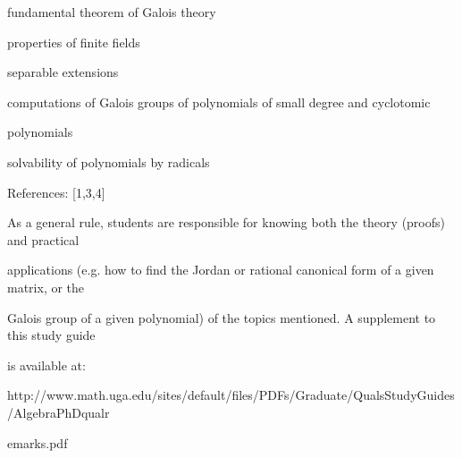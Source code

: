 \documentclass[a4paper,portrait,12pt]{article}
\begin{document}
\begin{flushleft}
fundamental theorem of Galois theory
\end{flushleft}


\begin{flushleft}
properties of finite fields
\end{flushleft}


\begin{flushleft}
separable extensions
\end{flushleft}


\begin{flushleft}
computations of Galois groups of polynomials of small degree and cyclotomic
\end{flushleft}


\begin{flushleft}
polynomials
\end{flushleft}


\begin{flushleft}
solvability of polynomials by radicals
\end{flushleft}


\begin{flushleft}
References: [1,3,4]
\end{flushleft}


\begin{flushleft}
As a general rule, students are responsible for knowing both the theory (proofs) and practical
\end{flushleft}


\begin{flushleft}
applications (e.g. how to find the Jordan or rational canonical form of a given matrix, or the
\end{flushleft}


\begin{flushleft}
Galois group of a given polynomial) of the topics mentioned. A supplement to this study guide
\end{flushleft}


\begin{flushleft}
is available at:
\end{flushleft}


\begin{flushleft}
http://www.math.uga.edu/sites/default/files/PDFs/Graduate/QualsStudyGuides/AlgebraPhDqualr
\end{flushleft}


\begin{flushleft}
emarks.pdf
\end{flushleft}
\end{document}
